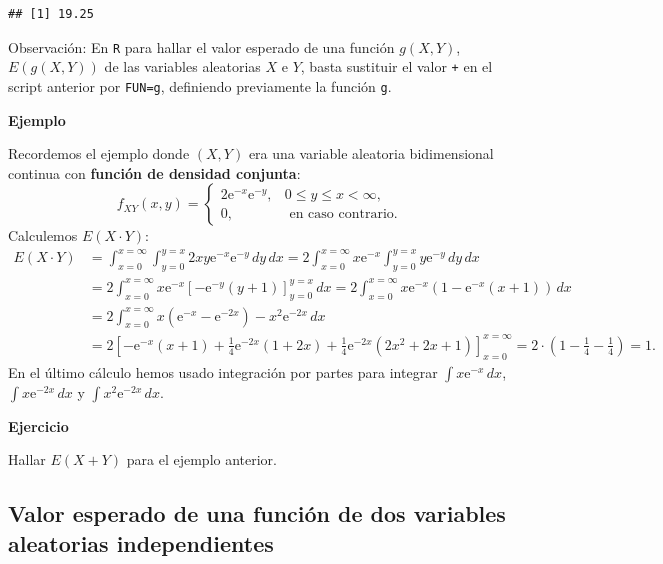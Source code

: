\documentclass[]{book}
\begin{document}
\begin{verbatim}
## [1] 19.25
\end{verbatim}

Observación:
En \texttt{R} para hallar el valor esperado de una función \(g(X,Y)\), \(E(g(X,Y))\) de las variables aleatorias \(X\) e \(Y\), basta sustituir el valor \texttt{+} en el script anterior por \texttt{FUN=g}, definiendo previamente la función \texttt{g}.

\textbf{Ejemplo}

Recordemos el ejemplo donde \((X,Y)\) era una variable aleatoria bidimensional continua con \textbf{función de densidad conjunta}:
\[
f_{XY}(x,y)=\begin{cases}
2 \mathrm{e}^{-x}\mathrm{e}^{-y}, & 0\leq y\leq x < \infty,\\
0, & \mbox{ en caso contrario.}
\end{cases}
\]
Calculemos \(E(X\cdot Y)\):
\[
\begin{array}{ll}
E(X\cdot Y) & =\int_{x=0}^{x=\infty} \int_{y=0}^{y=x} 2 x y \mathrm{e}^{-x}\mathrm{e}^{-y}\, dy\, dx=2\int_{x=0}^{x=\infty} x \mathrm{e}^{-x} \int_{y=0}^{y=x}  y \mathrm{e}^{-y}\, dy\, dx \\ & = 2\int_{x=0}^{x=\infty}x \mathrm{e}^{-x} \left[-\mathrm{e}^{-y} (y+1)\right]_{y=0}^{y=x}\, dx =
2\int_{x=0}^{x=\infty}x \mathrm{e}^{-x} \left(1-\mathrm{e}^{-x}(x+1)\right)\, dx \\ &= 2\int_{x=0}^{x=\infty}x\left( \mathrm{e}^{-x}-\mathrm{e}^{-2x}\right)-x^2\mathrm{e}^{-2x}\, dx \\ & =
2\left[-\mathrm{e}^{-x}(x+1)+\frac{1}{4}\mathrm{e}^{-2 x}(1+2x)+\frac{1}{4} \mathrm{e}^{-2 x} \left(2 x^2+2
   x+1\right)\right]_{x=0}^{x=\infty} = 2\cdot \left(1-\frac{1}{4}-\frac{1}{4}\right)=1.
\end{array}
\]
En el último cálculo hemos usado integración por partes para integrar \(\int x\mathrm{e}^{-x}\,dx\), \(\int x\mathrm{e}^{-2x}\,dx\) y \(\int x^2\mathrm{e}^{-2x}\, dx\).

\textbf{Ejercicio}

Hallar \(E(X+Y)\) para el ejemplo anterior.

\hypertarget{valor-esperado-de-una-funciuxf3n-de-dos-variables-aleatorias-independientes}{%
\subsection{Valor esperado de una función de dos variables aleatorias independientes}\label{valor-esperado-de-una-funciuxf3n-de-dos-variables-aleatorias-independientes}}
\end{document}
